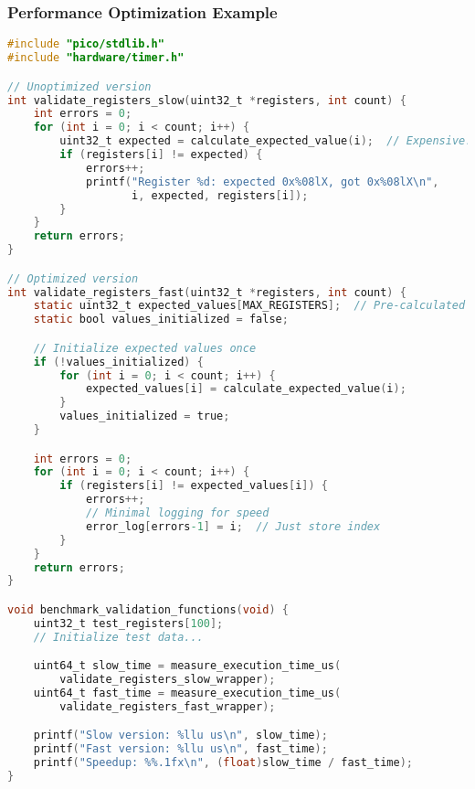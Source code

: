 \documentclass{beamer}
\begin{document}
\begin{frame}[fragile]
\frametitle{Performance Optimization Example}
\begin{lstlisting}[language=C]
#include "pico/stdlib.h"
#include "hardware/timer.h"

// Unoptimized version
int validate_registers_slow(uint32_t *registers, int count) {
    int errors = 0;
    for (int i = 0; i < count; i++) {
        uint32_t expected = calculate_expected_value(i);  // Expensive!
        if (registers[i] != expected) {
            errors++;
            printf("Register %d: expected 0x%08lX, got 0x%08lX\n",
                   i, expected, registers[i]);
        }
    }
    return errors;
}

// Optimized version
int validate_registers_fast(uint32_t *registers, int count) {
    static uint32_t expected_values[MAX_REGISTERS];  // Pre-calculated
    static bool values_initialized = false;

    // Initialize expected values once
    if (!values_initialized) {
        for (int i = 0; i < count; i++) {
            expected_values[i] = calculate_expected_value(i);
        }
        values_initialized = true;
    }

    int errors = 0;
    for (int i = 0; i < count; i++) {
        if (registers[i] != expected_values[i]) {
            errors++;
            // Minimal logging for speed
            error_log[errors-1] = i;  // Just store index
        }
    }
    return errors;
}

void benchmark_validation_functions(void) {
    uint32_t test_registers[100];
    // Initialize test data...

    uint64_t slow_time = measure_execution_time_us(
        validate_registers_slow_wrapper);
    uint64_t fast_time = measure_execution_time_us(
        validate_registers_fast_wrapper);

    printf("Slow version: %llu us\n", slow_time);
    printf("Fast version: %llu us\n", fast_time);
    printf("Speedup: %%.1fx\n", (float)slow_time / fast_time);
}
\end{lstlisting}
\end{frame}
\end{document}
